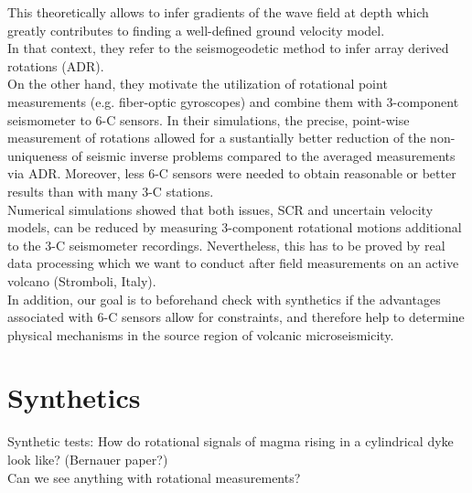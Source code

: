 \documentclass[12pt, a4paper]{article}
\begin{document}
This theoretically allows to infer gradients of the wave field at depth which greatly contributes to finding a well-defined ground velocity model.\\
In that context, they refer to the seismogeodetic method \citep{Spudich1995, Spudich2008} to infer array derived rotations (ADR).\\
On the other hand, they motivate the utilization of rotational point measurements (e.g. fiber-optic gyroscopes) and combine them with 3-component seismometer to 6-C sensors. In their simulations, the precise, point-wise measurement of rotations allowed for a sustantially better reduction of the non-uniqueness of seismic inverse problems compared to the averaged measurements via ADR. Moreover, less 6-C sensors were needed to obtain reasonable or better results than with many 3-C stations.\\

Numerical simulations showed that both issues, SCR and uncertain velocity models, can be reduced by measuring 3-component rotational motions additional to the 3-C seismometer recordings. Nevertheless, this has to be proved by real data processing which we want to conduct after field measurements on an active volcano (Stromboli, Italy).\\
In addition, our goal is to beforehand check with synthetics if the advantages associated with 6-C sensors allow for constraints, and therefore help to determine physical mechanisms in the source region of volcanic microseismicity.

\section*{Synthetics}
Synthetic tests: How do rotational signals of magma rising in a cylindrical dyke look like? (Bernauer paper?)\\
Can we see anything with rotational measurements?\\

\label{Bibliography}
\begin{singlespace*}
\small{

}
\end{singlespace*}
\end{document}
